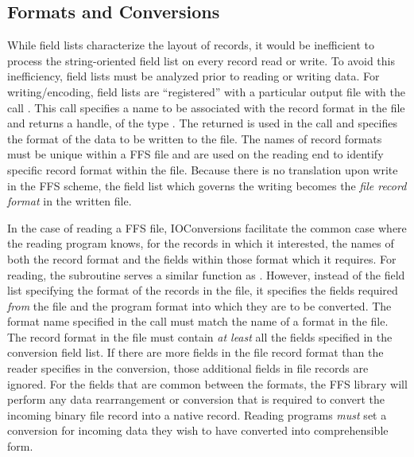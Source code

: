 \subsection{Formats and Conversions}

While field lists characterize the layout of records, it would be inefficient
to process the string-oriented field list on every record read or write.  To
avoid this inefficiency, field lists must be analyzed prior to reading or
writing data.  For writing/encoding, field lists are ``registered'' with a
particular output file with the call .  This
call specifies a name to be associated with the record format in the file and
returns a handle, of the type .  The returned  is used in
the 
 call and specifies the format of the data to be written to the
file.  The names of record formats must be unique within a FFS file and are
used on the reading end to identify specific record format within the file.
Because there is no translation upon write in the FFS scheme, the field list
which governs the writing  becomes the {\it file record format} in
the written file.

In the case of reading a FFS file, IOConversions facilitate the common case
where the reading program knows, for the records in which it interested, the
names of both the record format and the fields within those format which it
requires.  For reading, the subroutine  serves a
similar function as .  However, instead of
the field list specifying the format of the records in the file, it specifies
the fields required {\it from} the file and the program format into which they
are to be converted.  The format name specified in the
 call must match the name of a format in the file.
The record format in the file must contain {\it at least} all the fields
specified in the conversion field list.  If there are more fields in the file
record format than the reader specifies in the conversion, those additional
fields in file records are ignored.  For the fields that are common between
the formats, the FFS library will perform any data rearrangement or conversion
that is required to convert the incoming binary file record into a native
record.  Reading programs {\it must} set a conversion for incoming data they
wish to have converted into comprehensible form.  


